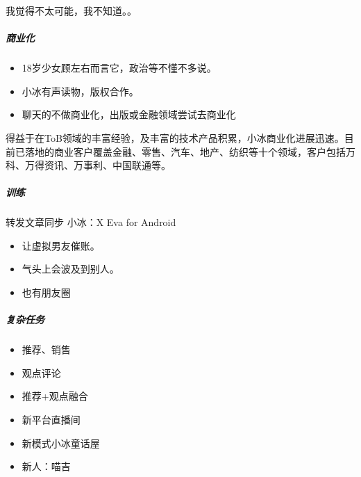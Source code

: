 \documentclass[letterpaper,10pt,english]{sphinxmanual}
\begin{document}
我觉得不太可能，我不知道。。


\subparagraph{商业化}
\label{\detokenize{chapter_AI_company/xiaoice:id15}}\begin{itemize}
\item {} 
18岁少女顾左右而言它，政治等不懂不多说。

\item {} 
小冰有声读物，版权合作。

\item {} 
聊天的不做商业化，出版或金融领域尝试去商业化
%
\begin{footnote}[1066]\sphinxAtStartFootnote
{}
%
\end{footnote}

\end{itemize}

得益于在ToB领域的丰富经验，及丰富的技术产品积累，小冰商业化进展迅速。目前已落地的商业客户覆盖金融、零售、汽车、地产、纺织等十个领域，客户包括万科、万得资讯、万事利、中国联通等。


\subparagraph{训练}
\label{\detokenize{chapter_AI_company/xiaoice:id16}}
\sphinxhyphen{}转发文章同步 \sphinxhyphen{}小冰：X Eva for Android
\begin{itemize}
\item {} 
让虚拟男友催账。

\item {} 
气头上会波及到别人。

\item {} 
也有朋友圈

\end{itemize}


\subparagraph{复杂任务}
\label{\detokenize{chapter_AI_company/xiaoice:id17}}\begin{itemize}
\item {} 
推荐、销售

\item {} 
观点评论

\item {} 
推荐+观点融合

\item {} 
新平台直播间

\item {} 
新模式小冰童话屋

\item {} 
新人：喵吉

\end{itemize}
\end{document}
